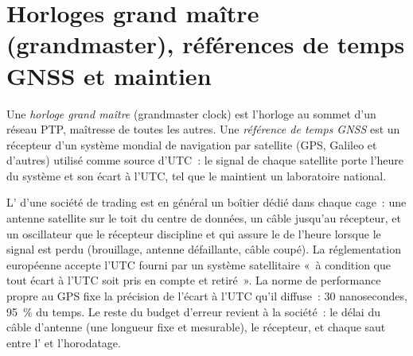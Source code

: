 \section{Horloges grand maître (grandmaster), références de temps GNSS et maintien}

\begin{definition}\label{def:nw:time-synchronisation:gm}
Une \emph{horloge grand maître} (grandmaster clock) est l'horloge au sommet d'un réseau PTP, maîtresse de toutes les autres. Une \emph{référence de
temps GNSS} est un récepteur d'un système mondial de navigation par satellite (GPS, Galileo et d'autres) utilisé comme
source d'UTC~: le signal de chaque satellite porte l'heure du système et son écart à l'UTC, tel que le maintient un laboratoire national.
\end{definition}

L' d'une société de trading est en général un boîtier dédié dans chaque cage~: une antenne satellite sur le toit du centre de données, un câble
jusqu'au récepteur, et un oscillateur que le récepteur discipline et qui assure le  de l'heure lorsque le signal est perdu
(brouillage, antenne défaillante, câble coupé). La réglementation européenne accepte l'UTC fourni par un système satellitaire «~à condition que tout écart à l'UTC
soit pris en compte et retiré~». La norme de performance propre au GPS fixe la précision de l'écart à l'UTC qu'il diffuse~: 30 nanosecondes,
95~\% du temps. Le reste du budget d'erreur revient à la société~: le délai du câble d'antenne (une longueur fixe et mesurable), le récepteur, et
chaque saut entre l' et l'horodatage.

